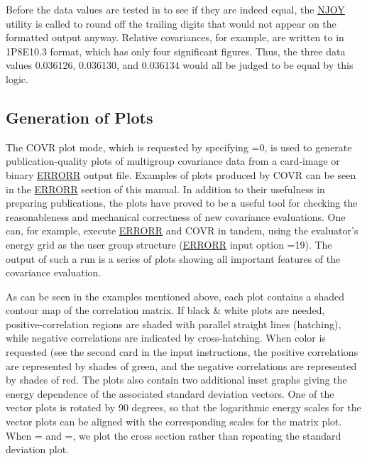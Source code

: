 Before the data values are tested in 
to see if they are indeed equal, the \hyperlink{sNJOYhy}{NJOY} utility
is called to round off the trailing digits that would not appear on
the formatted output anyway.  Relative covariances, for example, are
written to  in 1P8E10.3 format, which has only four
significant figures.  Thus, the three data values 0.036126, 0.036130,
and 0.036134 would all be judged to be equal by this logic.

\subsection{Generation of Plots}
\label{ssCOVR_plot}

The COVR plot mode, which is requested by specifying =0, is
used to generate publication-quality plots of multigroup covariance
data from a card-image or binary
\hyperlink{sERRORRhy}{ERRORR} output file.
Examples of plots produced by COVR can be seen in the
\hyperlink{sERRORRhy}{ERRORR} section
of this manual.  In addition to their usefulness in preparing
publications, the plots have proved to be a useful tool for checking
the reasonableness and mechanical correctness of new covariance
evaluations.  One can, for example, execute
\hyperlink{sERRORRhy}{ERRORR} and COVR in tandem,
using the evaluator's energy grid as the user group structure
(\hyperlink{sERRORRhy}{ERRORR} input option =19).  The
output of such a run
is a series of plots showing all important features of the covariance
evaluation.

As can be seen in the examples mentioned above, each plot contains a
shaded contour map of the correlation matrix.  If black \& white plots
are needed, positive-correlation regions are shaded with parallel
straight lines (hatching), while negative correlations are indicated
by cross-hatching.  When color is requested (see the second card in the
input instructions, the positive correlations are represented by shades
of green, and the negative correlations are represented by shades of red.
The plots also contain two additional inset graphs giving the energy
dependence of the associated standard deviation vectors.
One of the vector plots is rotated by 90 degrees, so that the
logarithmic energy scales for the vector plots can be aligned with
the corresponding scales for the matrix plot.  When =
and =, we plot the cross section rather than repeating
the standard deviation plot.

